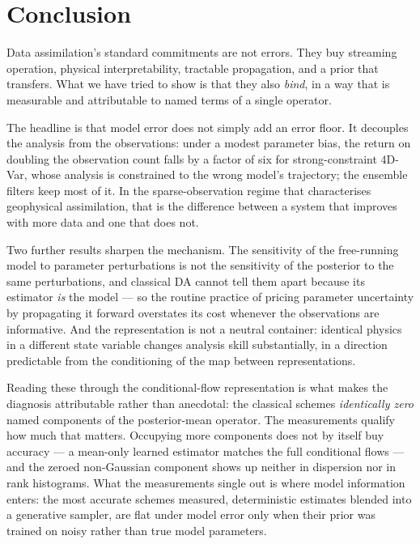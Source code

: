 \section{Conclusion}
\label{sec:conclusion}

Data assimilation's standard commitments are not errors. They buy streaming
operation, physical interpretability, tractable propagation, and a prior that
transfers. What we have tried to show is that they also \emph{bind}, in a way
that is measurable and attributable to named terms of a single operator.

The headline is that model error does not simply add an error floor. It
decouples the analysis from the observations: under a modest parameter bias, the
return on doubling the observation count falls by a factor of six for
strong-constraint 4D-Var, whose analysis is constrained to the wrong model's
trajectory; the ensemble filters keep most of it. In the sparse-observation regime that characterises geophysical
assimilation, that is the difference between a system that improves with more
data and one that does not.

Two further results sharpen the mechanism. The sensitivity of the free-running
model to parameter perturbations is not the sensitivity of the posterior to the
same perturbations, and classical DA cannot tell them apart because its
estimator \emph{is} the model --- so the routine practice of pricing parameter
uncertainty by propagating it forward overstates its cost whenever the
observations are informative. And the representation is not a neutral container:
identical physics in a different state variable changes analysis skill
substantially, in a direction predictable from the conditioning of the map
between representations.

Reading these through the conditional-flow representation is what makes the
diagnosis attributable rather than anecdotal: the classical schemes
\emph{identically zero} named components of the posterior-mean operator. The
measurements qualify how much that matters. Occupying more components does not by
itself buy accuracy --- a mean-only learned estimator matches the full conditional
flows --- and the zeroed non-Gaussian component shows up neither in dispersion nor
in rank histograms. What the measurements single out is where model information
enters: the most accurate schemes measured, deterministic estimates blended into a
generative sampler, are flat under model error only when their prior was
trained on noisy rather than true model parameters.

